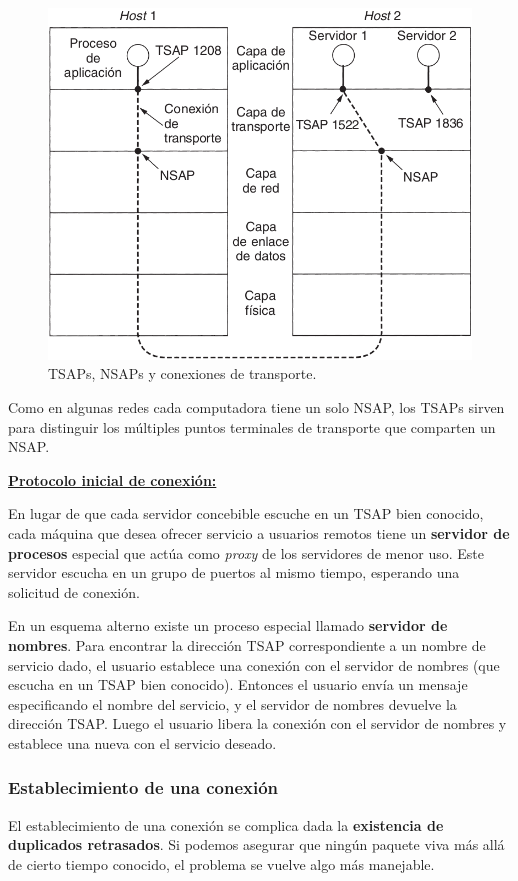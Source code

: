 \documentclass[10pt,a4paper]{article}
\begin{document}
\begin{figure}
  \caption{TSAPs, NSAPs y conexiones de transporte.}
  \label{fig:tsap_nsap}
  \centerline{\includegraphics[width=0.55\textwidth-\fboxrule-\fboxrule]{imgs/tsap_nsap.png}}
\end{figure}

Como en algunas redes cada computadora tiene un solo NSAP, los TSAPs sirven para distinguir los múltiples puntos terminales de transporte que comparten un NSAP.

\underline{\textbf{Protocolo inicial de conexión:}}

En lugar de que cada servidor concebible escuche en un TSAP bien conocido, cada máquina que desea ofrecer servicio a usuarios remotos tiene un \textbf{servidor de procesos} especial que actúa como \textit{proxy} de los servidores de menor uso. Este servidor escucha en un grupo de puertos al mismo tiempo, esperando una solicitud de conexión.

En un esquema alterno existe un proceso especial llamado \textbf{servidor de nombres}. Para encontrar la dirección TSAP correspondiente a un nombre de servicio dado, el usuario establece una conexión con el servidor de nombres (que escucha en un TSAP bien conocido). Entonces el usuario envía un mensaje especificando el nombre del servicio, y el servidor de nombres devuelve la dirección TSAP. Luego el usuario libera la conexión con el servidor de nombres y establece una nueva con el servicio deseado.

\subsubsection{Establecimiento de una conexión}

El establecimiento de una conexión se complica dada la \textbf{existencia de duplicados retrasados}. Si podemos asegurar que ningún paquete viva más allá de cierto tiempo conocido, el problema se vuelve algo más manejable.
\end{document}
